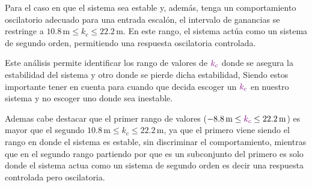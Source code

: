 Para el caso en que el sistema sea estable y, además, tenga un comportamiento oscilatorio adecuado para una entrada escalón, el intervalo de ganancias se restringe a \( 10.8 \, \text{m} \leq k_{c} \leq 22.2 \, \text{m} \). En este rango, el sistema actúa como un sistema de segundo orden, permitiendo una respuesta oscilatoria controlada.

Este análisis permite identificar los rango de valores de \(\mathbin{\color{violet}k_c}\) 
donde se asegura la estabilidad del sistema y otro donde se pierde dicha estabilidad, Siendo estos importante tener en cuenta para cuando que decida escoger un \(\mathbin{\color{violet}k_c}\) en nuestro sistema y no escoger uno donde sea inestable.

Ademas cabe destacar que el primer rango de valores (\( -8.8 \, \text{m} \leq \mathbin{\color{violet}k_c} \leq 22.2 \, \text{m} \)) es mayor que el segundo \( 10.8 \, \text{m} \leq k_{c} \leq 22.2 \, \text{m} \), ya que el primero viene siendo el rango en donde el sistema es estable, sin discriminar el comportamiento, mientras que en el segundo rango partiendo por que es un subconjunto del primero es solo donde el sistema actua como un sistema de segundo orden es decir una respuesta controlada pero oscilatoria.